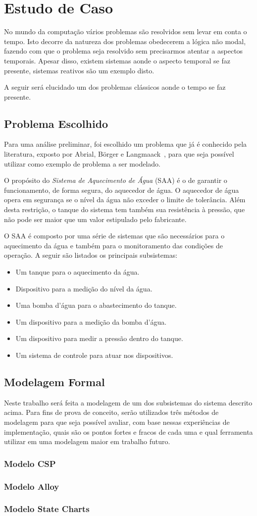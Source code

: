 \section{Estudo de Caso}
No mundo da computação vários problemas são resolvidos sem levar em conta o tempo.
Isto decorre da natureza dos problemas obedecerem a lógica não modal, fazendo com que o
problema seja resolvido sem precisarmos atentar a aspectos temporais. Apesar disso,
existem sistemas aonde o aspecto temporal se faz presente, sistemas reativos são um exemplo disto.

A seguir será elucidado um dos problemas clássicos aonde o tempo se faz presente.
\subsection{Problema Escolhido}
Para uma análise preliminar, foi escolhido um problema que já é conhecido pela literatura, exposto
por Abrial, B\"{o}rger e Langmaack~\cite{opac-b1092561}, para que seja possível utilizar como exemplo
de problema a ser modelado.

O propósito do \textit{Sistema de Aquecimento de Água} (SAA) é o de garantir o funcionamento,
de forma segura, do aquecedor de água. O aquecedor de água opera em segurança se o nível da água
não exceder o limite de tolerância. Além desta restrição, o tanque do sistema tem também
sua resistência à pressão, que não pode ser maior que um valor estipulado pelo fabricante.

O SAA é composto por uma série de sistemas que são necessários para o aquecimento da água e também
para o monitoramento das condições de operação. A seguir são listados os principais subsistemas:
\begin{itemize}
\item Um tanque para o aquecimento da água.
\item Dispositivo para a medição do nível da água.
\item Uma bomba d'água para o abastecimento do tanque.
\item Um dispositivo para a medição da bomba d'água.
\item Um dispositivo para medir a pressão dentro do tanque.
\item Um sistema de controle para atuar nos dispositivos.
\end{itemize}

\subsection{Modelagem Formal}
Neste trabalho será feita a modelagem de um dos subsistemas do sistema descrito acima.
Para fins de prova de conceito, serão utilizados três métodos de modelagem para que seja possível avaliar,
com base nessas experiências de implementação, quais são os pontos fortes e fracos de cada uma e qual ferramenta
utilizar em uma modelagem maior em trabalho futuro.
\subsubsection{Modelo CSP}
\subsubsection{Modelo Alloy}
\subsubsection{Modelo State Charts}
